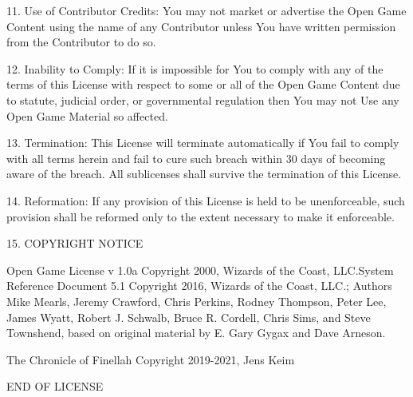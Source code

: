\documentclass[letter,10pt,twocolumn,openany]{dndbook}
\begin{document}
11. Use of Contributor Credits: You may not market or advertise the Open Game Content using the name of any Contributor unless You have written permission from the Contributor to do so.

12. Inability to Comply: If it is impossible for You to comply with any of the terms of this License with respect to some or all of the Open Game Content due to statute, judicial order, or governmental regulation then You may not Use any Open Game Material so affected.

13. Termination: This License will terminate automatically if You fail to comply with all terms herein and fail to cure such breach within 30 days of becoming aware of the breach. All sublicenses shall survive the termination of this License.

14. Reformation: If any provision of this License is held to be unenforceable, such provision shall be reformed only to the extent necessary to make it enforceable.

15. COPYRIGHT NOTICE

    Open Game License v 1.0a Copyright 2000, Wizards of the Coast, LLC.System Reference Document 5.1 Copyright 2016, Wizards of the Coast, LLC.; Authors Mike Mearls, Jeremy Crawford, Chris Perkins, Rodney Thompson, Peter Lee, James Wyatt, Robert J. Schwalb, Bruce R. Cordell, Chris Sims, and Steve Townshend, based on original material by E. Gary Gygax and Dave Arneson.

    The Chronicle of Finellah Copyright 2019-2021, Jens Keim

END OF LICENSE
\end{document}
